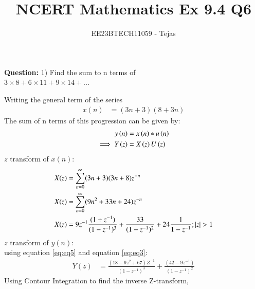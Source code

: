 \documentclass[journal,12pt,twocolumn]{IEEEtran}
\theoremstyle{remark}
\begin{document}

\vspace{3cm}

\title{NCERT Mathematics Ex 9.4 Q6}
\author{EE23BTECH11059 - Tejas$^{}$%
}
\maketitle
\newpage
\textbf{Question:}
1) Find the sum to n terms of\\$3 \times 8 + 6 \times 11 + 9 \times 14 + ...$
        

    
    \solution
        
        Writing the general term of the series
        \begin{align}
            x(n)&=(3n+3)(8+3n)  
        \end{align}
        The sum of n terms of this progression can be given by:
        \begin{align}
    y\left(n\right) &= x\left(n\right)*u\left(n\right)\\
    \implies  Y\left(z\right) &= X\left(z\right)U\left(z\right) \label{eq:eq3}
\end{align}
$z$ transform of $x(n)$:
        \begin{align}
            X(z) &= \sum_{n=0}^{\infty} (3n+3)(3n+8)z^{-n} \\
            X(z) &= \sum_{n=0}^{\infty} (9n^2 +33n+24)z^{-n} \\
            X(z)&=9z^{-1}\frac{(1+z^{-1})}{(1-z^{-1})^3} + \frac{33}{(1-z^{-1})^2} +24\frac{1}{1-z^{-1}}; \left\vert z\right\vert>1    \label{eq:eq5}
        \end{align}
        $z$ transform of $y(n)$:\\
        using equation \eqref{eq:eq5} and equation \eqref{eq:eq3}:
        \begin{align}
            Y(z)&= \frac{(18-9z^2+67)Z^{-1}}{(1-z^{-1})^3} + \frac{(42-9z^{-1})}{(1-z^{-1})^2} 
        \end{align}
        Using Contour Integration to find the inverse Z-transform,
        
\end{document}
